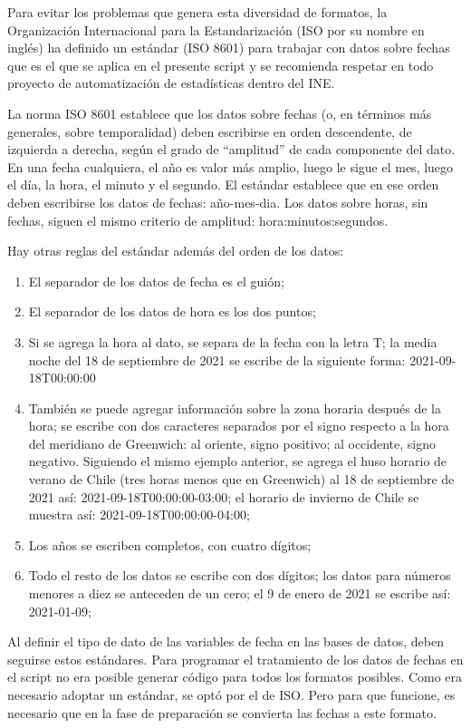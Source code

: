 \documentclass[
  spanish,
]{book}
\begin{document}
Para evitar los problemas que genera esta diversidad de formatos, la Organización Internacional para la Estandarización (ISO por su nombre en inglés) ha definido un estándar (ISO 8601) para trabajar con datos sobre fechas que es el que se aplica en el presente script y se recomienda respetar en todo proyecto de automatización de estadísticas dentro del INE.

La norma ISO 8601 establece que los datos sobre fechas (o, en términos más generales, sobre temporalidad) deben escribirse en orden descendente, de izquierda a derecha, según el grado de ``amplitud'' de cada componente del dato. En una fecha cualquiera, el año es valor más amplio, luego le sigue el mes, luego el día, la hora, el minuto y el segundo. El estándar establece que en ese orden deben escribirse los datos de fechas: año-mes-dia. Los datos sobre horas, sin fechas, siguen el mismo criterio de amplitud: hora:minutos:segundos.

Hay otras reglas del estándar además del orden de los datos:

\begin{enumerate}
\def\labelenumi{\arabic{enumi}.}
\item
  El separador de los datos de fecha es el guión;
\item
  El separador de los datos de hora es los dos puntos;
\item
  Si se agrega la hora al dato, se separa de la fecha con la letra T; la media noche del 18 de septiembre de 2021 se escribe de la siguiente forma: 2021-09-18T00:00:00
\item
  También se puede agregar información sobre la zona horaria después de la hora; se escribe con dos caracteres separados por el signo respecto a la hora del meridiano de Greenwich: al oriente, signo positivo; al occidente, signo negativo. Siguiendo el mismo ejemplo anterior, se agrega el huso horario de verano de Chile (tres horas menos que en Greenwich) al 18 de septiembre de 2021 así: 2021-09-18T00:00:00-03:00; el horario de invierno de Chile se muestra así: 2021-09-18T00:00:00-04:00;
\item
  Los años se escriben completos, con cuatro dígitos;
\item
  Todo el resto de los datos se escribe con dos dígitos; los datos para números menores a diez se anteceden de un cero; el 9 de enero de 2021 se escribe así: 2021-01-09;
\end{enumerate}

Al definir el tipo de dato de las variables de fecha en las bases de datos, deben seguirse estos estándares. Para programar el tratamiento de los datos de fechas en el script no era posible generar código para todos los formatos posibles. Como era necesario adoptar un estándar, se optó por el de ISO. Pero para que funcione, es necesario que en la fase de preparación se convierta las fechas a este formato.
\end{document}
